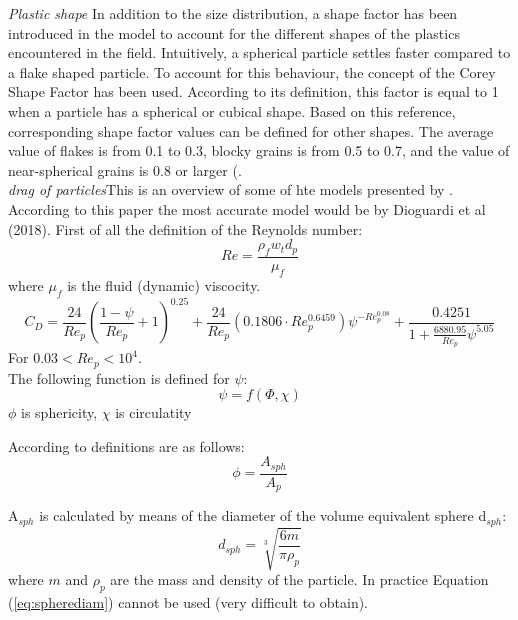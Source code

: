 \documentclass[english]{deltares_manual}
\begin{document}
\textit{Plastic shape}
In addition to the size distribution, a shape factor has been introduced in the model to account for the different shapes of the plastics encountered in the field. Intuitively, a spherical particle settles faster compared to a flake shaped particle. To account for this behaviour, the concept of the Corey Shape Factor has been used. According to its definition, this factor is equal to 1 when a particle has a spherical or cubical shape. Based on this reference, corresponding shape factor values can be defined for other shapes.
The average value of flakes is from 0.1 to 0.3, blocky grains is from 0.5 to 0.7, and the value of near-spherical grains is 0.8 or larger (\cite{Hou1992}.\\

\textit{drag of particles}This is an overview of some of hte models presented by \cite{VanMelkebeke2020}. According to this paper the most accurate model would be by Dioguardi et al (2018).
First of all the definition of the Reynolds number:
\begin{equation}
	Re= \frac{\rho_{f}w_{t}d_{p}}{\mu_{f}}
\end{equation}
where $\mu_{f}$ is the fluid (dynamic) viscocity. 
\begin{equation}\label{dioguardi}
	C_{D} = \frac{24}{Re_{p}} \left( \frac{1-\psi}{Re_{p}} + 1 \right)^{0.25} + 
	\frac{24}{Re_{p}} \left( 0.1806 \cdot Re_{p}^{0.6459} \right) \psi^{-Re_{p}^{0.08}} +
	\frac{0.4251}{1+\frac{6880.95}{Re_{p}}\psi^{5.05}}
\end{equation}
For $0.03 < Re_{p} < 10^{4}$. \\

The following function is defined for $\psi$:
\begin{equation}\label{psi}
	\psi = f(\Phi, \chi)
\end{equation}
$\phi$ is sphericity, $\chi$ is circulatity 

According to \cite{Dioguardi2018} definitions are as follows:
\begin{equation}
	\phi= \frac{A_{sph}}{A_{p}}
	\label{key}
\end{equation}

A$_{sph}$ is calculated by means of the diameter of the volume equivalent sphere d$_{sph}$:
\begin{equation}
	d_{sph}= \sqrt[3]{\frac{6m}{\pi \rho_{p}}}
	\label{eq:spherediam}
\end{equation}
where $m$ and $\rho_{p}$ are the mass and density of the particle. In practice Equation (\ref{eq:spherediam}) cannot be used (very difficult to obtain). 
\end{document}
